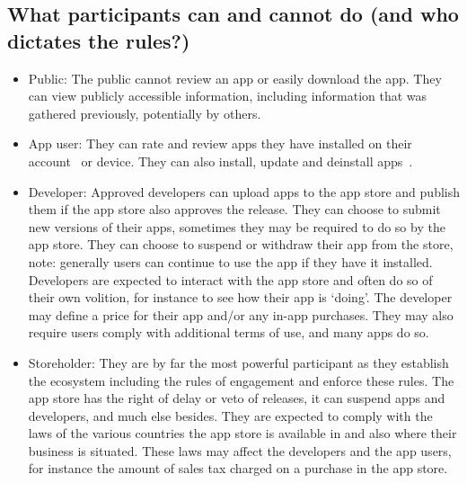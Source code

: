 \subsection{What participants can and cannot do (and who dictates the rules?)}
\begin{itemize}
    \item Public: The public cannot review an app or easily download the app. They can view publicly accessible information, including information that was gathered previously, potentially by others.
    \item App user: They can rate and review apps they have installed on their account~ or device. They can also install, update and deinstall apps~.
    \item Developer:  Approved developers can upload apps to the app store and publish them if the app store also approves the release. They can choose to submit new versions of their apps, sometimes they may be required to do so by the app store. They can choose to suspend or withdraw their app from the store, note: generally users can continue to use the app if they have it installed. Developers are expected to interact with the app store and often do so of their own volition, for instance to see how their app is `doing'. The developer may define a price for their app and/or any in-app purchases. They may also require users comply with additional terms of use, and many apps do so.
    \item Storeholder: They are by far the most powerful participant as they establish the ecosystem including the rules of engagement and enforce these rules. The app store has the right of delay or veto of releases, it can suspend apps and developers, and much else besides. They are expected to comply with the laws of the various countries the app store is available in and also where their business is situated. These laws may affect the developers and the app users, for instance the amount of sales tax charged on a purchase in the app store.
\end{itemize}

